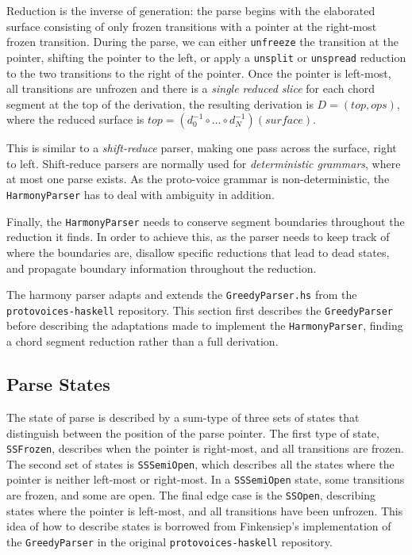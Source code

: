 \documentclass[12pt,a4paper,twoside,openany]{report} \usepackage[pdfborder={0 0 0}]{hyperref}    %
\theoremstyle{definition} \newtheorem{definition}{Definition}[section]
\begin{document}
      Reduction is the inverse of generation: the parse begins with the elaborated surface consisting of only frozen
      transitions with a pointer at the right-most frozen transition. During the parse, we can either \texttt{unfreeze}
      the transition at the pointer, shifting the pointer to the left, or apply a \texttt{unsplit} or \texttt{unspread}
      reduction to the two transitions to the right of the pointer. Once the pointer is left-most, all transitions are
      unfrozen and there is a \textit{single reduced slice} for each chord segment at the top of the derivation, the
      resulting derivation is $D = (top, ops)$, where the reduced surface is $top = (d_0^{-1} \circ \dots \circ
      d_N^{-1}) (surface)$.

      This is similar to a \textit{shift-reduce} parser, making one pass across the surface, right to left.
      Shift-reduce parsers are normally used for \textit{deterministic grammars}, where at most one parse exists.
      As the proto-voice grammar is non-deterministic, the \texttt{HarmonyParser} has to deal with ambiguity in
      addition. 

      Finally, the \texttt{HarmonyParser} needs to conserve segment boundaries throughout the reduction it finds.
      In order to achieve this, as the parser needs to keep track of where the boundaries are, disallow specific
      reductions that lead to dead states, and propagate boundary information throughout the reduction. 

      The harmony parser adapts and extends the \texttt{GreedyParser.hs} from the \texttt{protovoices-haskell}
      repository. 
      This section first describes the \texttt{GreedyParser} before describing the adaptations made to implement the \texttt{HarmonyParser}, finding a chord segment reduction rather than a full derivation.
      
      \subsection{Parse States}
      The state of parse is described by a sum-type of three sets of states that distinguish between the position
      of the parse pointer. The first type of state, \texttt{SSFrozen}, describes when the pointer is right-most,
      and all transitions are frozen. The second set of states is \texttt{SSSemiOpen}, which describes all the
      states where the pointer is neither left-most or right-most. In a \texttt{SSSemiOpen} state, some
      transitions are frozen, and some are open. The final edge case is the \texttt{SSOpen}, describing states
      where the pointer is left-most, and all transitions have been unfrozen. This idea of how to describe states is borrowed from Finkensiep's implementation of the \texttt{GreedyParser} in the original \texttt{protovoices-haskell} repository.
\end{document}
